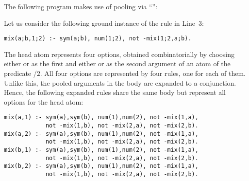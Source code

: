 \begin{example}\label{ex:pool}
The following program makes use of pooling via ``\code{;}'':
%

%
Let us consider the following ground instance of the rule in Line~3:
\begin{lstlisting}[numbers=none]
 mix(a;b,1;2) :- sym(a;b), num(1;2), not -mix(1;2,a;b).
\end{lstlisting}
The head atom  
represents four options, obtained combinatorially
by choosing either  or  as the first
and either  or  as the second argument
of an atom of the predicate /$2$.
All four options are represented by four rules,
one for each of them.
Unlike this,
the pooled arguments in the body are expanded to a conjunction.
Hence, the following expanded rules share the same body but represent
all options for the head atom:%
%
%
\begin{lstlisting}[numbers=none]
mix(a,1) :- sym(a),sym(b), num(1),num(2), not -mix(1,a),
            not -mix(1,b), not -mix(2,a), not -mix(2,b).
mix(a,2) :- sym(a),sym(b), num(1),num(2), not -mix(1,a),
            not -mix(1,b), not -mix(2,a), not -mix(2,b).
mix(b,1) :- sym(a),sym(b), num(1),num(2), not -mix(1,a),
            not -mix(1,b), not -mix(2,a), not -mix(2,b).
mix(b,2) :- sym(a),sym(b), num(1),num(2), not -mix(1,a),
            not -mix(1,b), not -mix(2,a), not -mix(2,b).
\end{lstlisting}
\eexample
\end{example}

